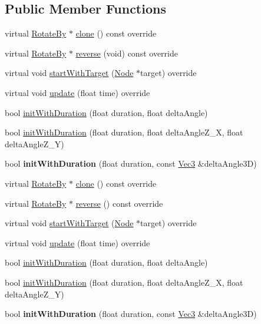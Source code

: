 \subsection*{Public Member Functions}
\begin{DoxyCompactItemize}
\item 
virtual \hyperlink{classRotateBy}{Rotate\+By} $\ast$ \hyperlink{classRotateBy_a357bd8a66b4d47a8be520d49a35e5a29}{clone} () const override
\item 
virtual \hyperlink{classRotateBy}{Rotate\+By} $\ast$ \hyperlink{classRotateBy_a3aab93d46d83679a5ce4b51a9a554031}{reverse} (void) const override
\item 
virtual void \hyperlink{classRotateBy_aaad515a54f706e1b5a9e6f17beb2371a}{start\+With\+Target} (\hyperlink{classNode}{Node} $\ast$target) override
\item 
virtual void \hyperlink{classRotateBy_ab893a1ea5e91e7d506c63d08322ce218}{update} (float time) override
\item 
bool \hyperlink{classRotateBy_a48df6f744dd4d505b2b78cbe599b8724}{init\+With\+Duration} (float duration, float delta\+Angle)
\item 
bool \hyperlink{classRotateBy_a68722de21a44b6efa8b85654c7ebd69c}{init\+With\+Duration} (float duration, float delta\+Angle\+Z\+\_\+X, float delta\+Angle\+Z\+\_\+Y)
\item 
\mbox{\label{classRotateBy_adc41609e6c90a1e31f1b64b3dafd5634}} 
bool {\bfseries init\+With\+Duration} (float duration, const \hyperlink{classVec3}{Vec3} \&delta\+Angle3D)
\item 
virtual \hyperlink{classRotateBy}{Rotate\+By} $\ast$ \hyperlink{classRotateBy_ab60e1cfbd4a1d46c53ce44de44569e44}{clone} () const override
\item 
virtual \hyperlink{classRotateBy}{Rotate\+By} $\ast$ \hyperlink{classRotateBy_aa04dbf8b2b38410ba025fed3d23d4f67}{reverse} () const override
\item 
virtual void \hyperlink{classRotateBy_a3b0eb97d069ef935dd7546328522a31d}{start\+With\+Target} (\hyperlink{classNode}{Node} $\ast$target) override
\item 
virtual void \hyperlink{classRotateBy_ac0a29a18c0232c7502b8bd53ac5de399}{update} (float time) override
\item 
bool \hyperlink{classRotateBy_a48df6f744dd4d505b2b78cbe599b8724}{init\+With\+Duration} (float duration, float delta\+Angle)
\item 
bool \hyperlink{classRotateBy_a68722de21a44b6efa8b85654c7ebd69c}{init\+With\+Duration} (float duration, float delta\+Angle\+Z\+\_\+X, float delta\+Angle\+Z\+\_\+Y)
\item 
\mbox{\label{classRotateBy_adc41609e6c90a1e31f1b64b3dafd5634}} 
bool {\bfseries init\+With\+Duration} (float duration, const \hyperlink{classVec3}{Vec3} \&delta\+Angle3D)
\end{DoxyCompactItemize}
